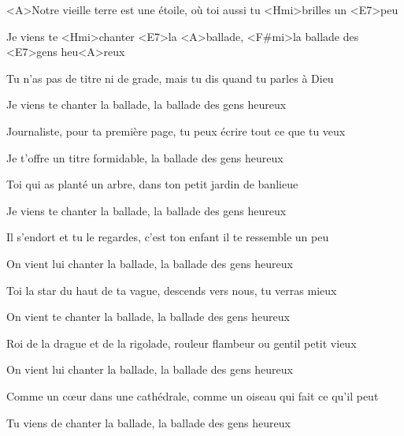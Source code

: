 

\zs
<A>Notre vieille terre est une étoile, où toi aussi tu <Hmi>brilles un <E7>peu

Je viens te <Hmi>chanter <E7>la <A>ballade, <F#mi>la ballade des <E7>gens heu<A>reux
\ks

\zs
Tu n'as pas de titre ni de grade, mais tu dis  quand tu parles à Dieu

Je viens te chanter la ballade, la ballade des gens heureux
\ks

\zs
Journaliste, pour ta première page, tu peux écrire tout ce que tu veux

Je t'offre un titre formidable, la ballade des gens heureux
\ks

\zs
Toi qui as planté un arbre, dans ton petit jardin de banlieue

Je viens te chanter la ballade, la ballade des gens heureux
\ks

\zs
Il s'endort et tu le regardes, c'est ton enfant il te ressemble un peu

On vient lui chanter la ballade, la ballade des gens heureux
\ks

\zs
Toi la star du haut de ta vague, descends vers nous, tu verras mieux

On vient te chanter la ballade, la ballade des gens heureux
\ks

\zs
Roi de la drague et de la rigolade, rouleur flambeur ou gentil petit vieux

On vient lui chanter la ballade, la ballade des gens heureux
\ks

\zs
Comme un cœur dans une cathédrale, comme un oiseau qui fait ce qu'il peut

Tu viens de chanter la ballade, la ballade des gens heureux
\ks

\kp

